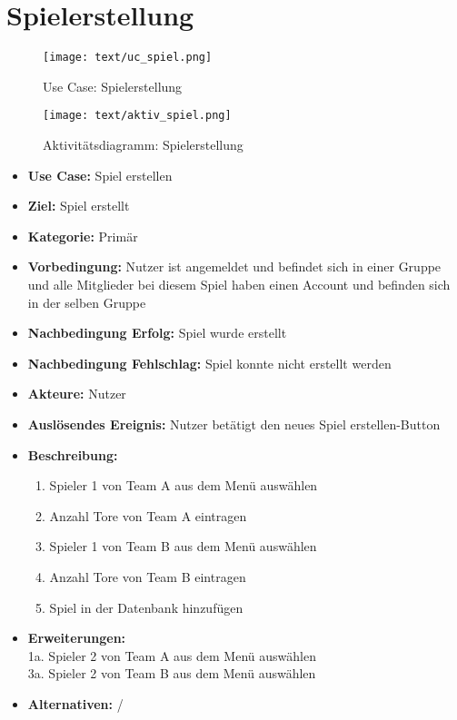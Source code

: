 \section{Spielerstellung}
\begin{figure}[h!]
	\centering
	\texttt{[image: text/uc\_spiel.png]}
	\caption{Use Case: Spielerstellung}
	\label{uc_spiel}
\end{figure}
\begin{figure}[h!]
	\centering
	\texttt{[image: text/aktiv\_spiel.png]}
	\caption{Aktivitätsdiagramm: Spielerstellung}
	\label{aktiv_spiel}
\end{figure}
\begin{itemize}
	\item \textbf{Use Case:} Spiel erstellen
	\item \textbf{Ziel:} Spiel erstellt
	\item \textbf{Kategorie:} Primär
	\item \textbf{Vorbedingung:} Nutzer ist angemeldet und befindet sich in einer Gruppe und alle Mitglieder bei diesem Spiel haben einen Account und befinden sich in der selben Gruppe
	\item \textbf{Nachbedingung Erfolg:} Spiel wurde erstellt
	\item \textbf{Nachbedingung Fehlschlag:} Spiel konnte nicht erstellt werden
	\item \textbf{Akteure:} Nutzer
	\item \textbf{Auslösendes Ereignis:} Nutzer betätigt den \glqq neues Spiel erstellen\grqq{}-Button
	\item \textbf{Beschreibung:} \begin{enumerate}
		\item Spieler 1 von Team A aus dem Menü auswählen
		\item Anzahl Tore von Team A eintragen
		\item Spieler 1 von Team B aus dem Menü auswählen
		\item Anzahl Tore von Team B eintragen
		\item Spiel in der Datenbank hinzufügen
	\end{enumerate}
	\item \textbf{Erweiterungen:} \\1a. Spieler 2 von Team A aus dem Menü auswählen\\
	3a. Spieler 2 von Team B aus dem Menü auswählen
	\item \textbf{Alternativen:} /
\end{itemize}

